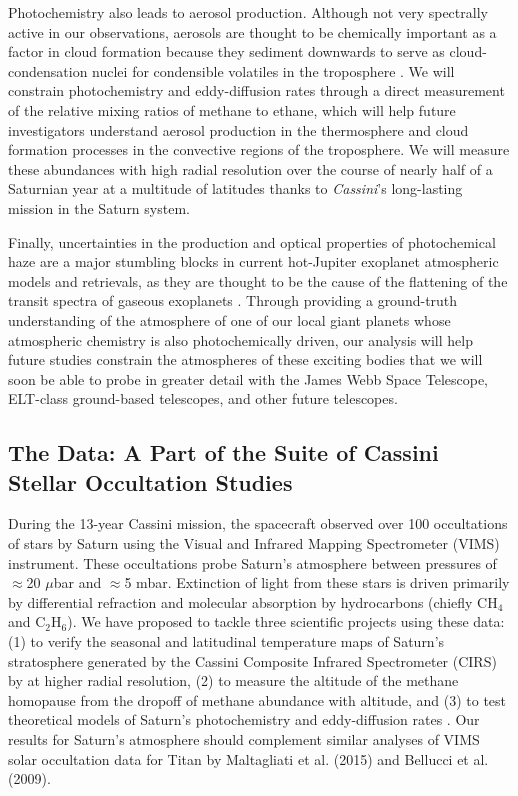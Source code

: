 \documentclass[twocolumn, twocolappendix, numberedappendix, linenumbers]{aastex631}
\newcommand{\Cas}{{\it Cassini}}
\begin{document}
Photochemistry also leads to aerosol production. Although not very spectrally
active in our observations, aerosols are thought to be chemically important as
a factor in cloud formation because they sediment downwards to serve as
cloud-condensation nuclei for condensible volatiles in the troposphere
\citep{Fletcher2018}. We will constrain photochemistry and eddy-diffusion rates
through a direct measurement of the relative mixing ratios of methane to
ethane, which will help future investigators understand aerosol production in
the thermosphere and cloud formation processes in the convective regions of the
troposphere. We will measure these abundances with high radial resolution over
the course of nearly half of a Saturnian year at a multitude of latitudes
thanks to \Cas's long-lasting mission in the Saturn system.

Finally, uncertainties in the production and optical properties of
photochemical haze are a major stumbling blocks in current hot-Jupiter
exoplanet atmospheric models and retrievals, as they are thought to be the
cause of the flattening of the transit spectra of gaseous exoplanets
\citep{Fraine2013}.  Through providing a ground-truth
understanding of the atmosphere of one of our local giant planets whose
atmospheric chemistry is also photochemically driven, our analysis will help
future studies constrain the atmospheres of these exciting bodies that we will
soon be able to probe in greater detail with the James Webb Space Telescope,
ELT-class ground-based telescopes, and other future telescopes.


\subsection{The Data: A Part of the Suite of Cassini Stellar Occultation Studies} \label{sec:intro-data}

During the 13-year Cassini mission, the spacecraft observed over 100
occultations of stars by Saturn using the Visual and Infrared Mapping
Spectrometer (VIMS) instrument. These occultations probe Saturn’s atmosphere
between pressures of $\approx$20 $\mu$bar and $\approx$5 mbar. Extinction of light from these stars
is driven primarily by differential refraction and molecular absorption by
hydrocarbons (chiefly CH$_4$ and C$_2$H$_6$). We have proposed to tackle three
scientific projects using these data: (1) to verify the seasonal and
latitudinal temperature maps of Saturn’s stratosphere generated by the Cassini
Composite Infrared Spectrometer (CIRS) by \citealp{Fletcher2007} at higher
radial resolution, (2) to measure the altitude of the methane homopause from
the dropoff of methane abundance with altitude, and (3) to test theoretical
models of Saturn's photochemistry and eddy-diffusion rates \citep{Moses2005}. Our
results for Saturn's atmosphere should complement similar analyses of VIMS
solar occultation data for Titan by Maltagliati et al.  (2015) and Bellucci et
al. (2009).
\end{document}
